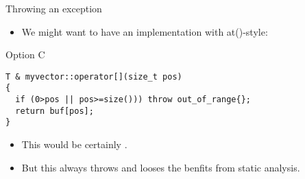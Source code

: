 \begin{frame}[t,fragile]{Throwing an exception}
\begin{itemize}
  \item We might want to have an implementation with at()-style:
\end{itemize}
\begin{block}{Option C}
\begin{lstlisting}
T & myvector::operator[](size_t pos)
{
  if (0>pos || pos>=size())) throw out_of_range{};
  return buf[pos];
}
\end{lstlisting}
\end{block}
\begin{itemize}
  \item This would be certainly .
  \item But this always throws and looses the benfits from static analysis.
\end{itemize}
\end{frame}
